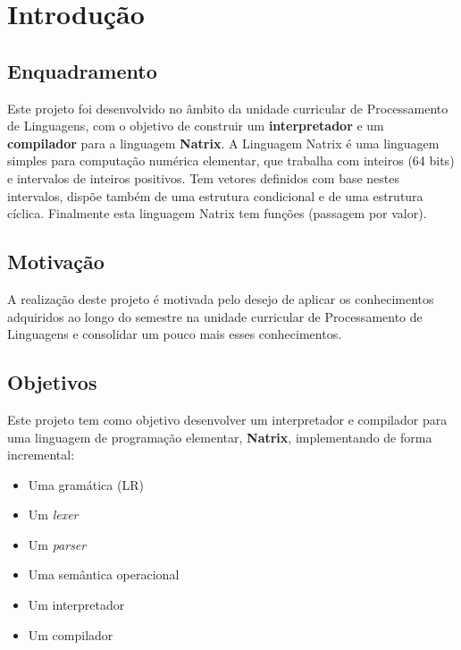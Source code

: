 \section{Introdução}
\label{sec1:intro}

\subsection{Enquadramento}
\label{sec1:subsec:square}

Este projeto foi desenvolvido no âmbito da unidade curricular de Processamento de Linguagens, com o objetivo de construir um \textbf{interpretador} e um \textbf{compilador} para a linguagem \textbf{Natrix}.
A Linguagem Natrix é uma linguagem simples para computação numérica elementar, que trabalha com inteiros (64 bits) e intervalos de inteiros positivos. Tem vetores definidos com base nestes intervalos, dispõe também de uma estrutura condicional e de uma estrutura cíclica.
Finalmente esta linguagem Natrix tem funções (passagem por valor).

\subsection{Motivação}
\label{sec1:subsec:motive}

A realização deste projeto é motivada pelo desejo de aplicar os conhecimentos adquiridos ao longo do semestre na unidade curricular de Processamento de Linguagens e consolidar um pouco mais esses conhecimentos.

\subsection{Objetivos}
\label{sec1:subsec:goals}

Este projeto tem como objetivo desenvolver um interpretador e compilador para uma linguagem de programação elementar, \textbf{Natrix}, implementando de forma incremental:

\begin{itemize}
    \item Uma gramática (LR)
    \item Um \textit{lexer}
    \item Um \textit{parser}
    \item Uma semântica operacional
    \item Um interpretador
    \item Um compilador
\end{itemize}
